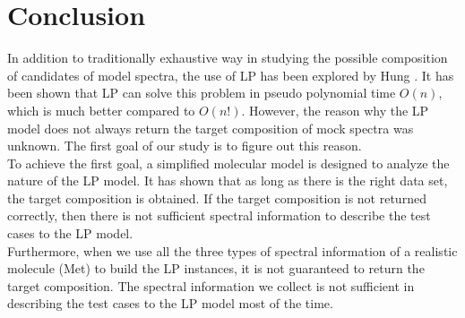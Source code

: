   \label{ch:7}

\section{Conclusion}
In addition to traditionally exhaustive way in studying the possible composition of candidates of model spectra, the use of LP has been explored by Hung \cite{KuoKaiHung:Thesis:2015}. It has been shown that LP can solve this problem in pseudo polynomial time $O(n)$, which is much better compared to $O(n!)$. However, the reason why the LP model does not always return the target composition of mock spectra was unknown. The first goal of our study is to figure out this reason. \\

To achieve the first goal, a simplified molecular model is designed to analyze the nature of the LP model. It has shown that as long as there is the right data set, the target composition is obtained. If the target composition is not returned correctly, then there is not sufficient spectral information to describe the test cases to the LP model. \\

Furthermore, when we use all the three types of spectral information of a realistic molecule (Met) to build the LP instances, it is not guaranteed to return the target composition. The spectral information we collect is not sufficient in describing the test cases to the LP model most of the time. \\



